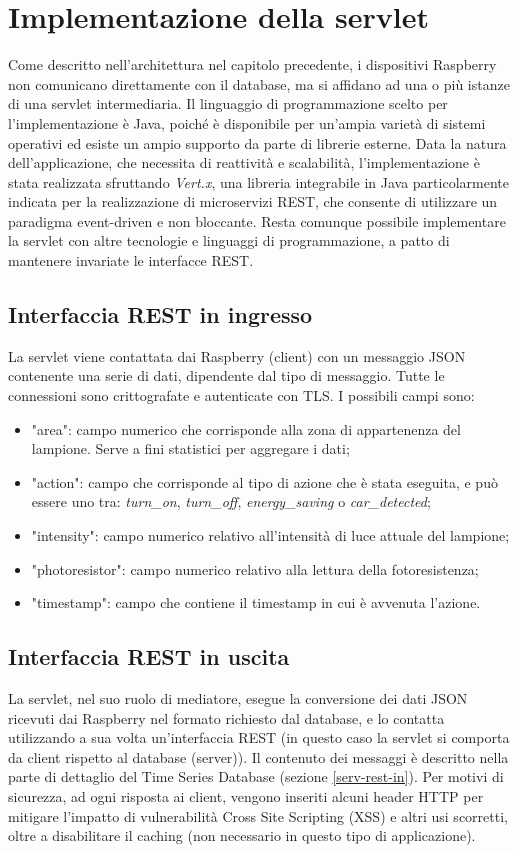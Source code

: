 \section{Implementazione della servlet \label{serv-impl}}
Come descritto nell'architettura nel capitolo precedente, i dispositivi Raspberry non comunicano direttamente con il database, ma si affidano ad una o più istanze di una servlet intermediaria.
Il linguaggio di programmazione scelto per l'implementazione è Java, poiché è disponibile per un'ampia varietà di sistemi operativi ed esiste un ampio supporto da parte di librerie esterne.
Data la natura dell'applicazione, che necessita di reattività e scalabilità, l'implementazione è stata realizzata sfruttando \textit{Vert.x}, una libreria integrabile in Java particolarmente indicata per la realizzazione di microservizi REST, che consente di utilizzare un paradigma event-driven e non bloccante.
Resta comunque possibile implementare la servlet con altre tecnologie e linguaggi di programmazione, a patto di mantenere invariate le interfacce REST.

\subsection{Interfaccia REST in ingresso \label{serv-rest-in}}
La servlet viene contattata dai Raspberry (client) con un messaggio JSON contenente una serie di dati, dipendente dal tipo di messaggio. Tutte le connessioni sono crittografate e autenticate con TLS.
I possibili campi sono:
\begin{itemize}
 \item "area": campo numerico che corrisponde alla zona di appartenenza del lampione. Serve a fini statistici per aggregare i dati;
 \item "action": campo che corrisponde al tipo di azione che è stata eseguita, e può essere uno tra: \textit{turn\_on}, \textit{turn\_off}, \textit{energy\_saving} o \textit{car\_detected};
 \item "intensity": campo numerico relativo all'intensità di luce attuale del lampione;
 \item "photoresistor": campo numerico relativo alla lettura della fotoresistenza;
 \item "timestamp": campo che contiene il timestamp in cui è avvenuta l'azione.
\end{itemize}

\subsection{Interfaccia REST in uscita}
La servlet, nel suo ruolo di mediatore, esegue la conversione dei dati JSON ricevuti dai Raspberry nel formato richiesto dal database, e lo contatta utilizzando a sua volta un'interfaccia REST (in questo caso la servlet si comporta da client rispetto al database (server)).
Il contenuto dei messaggi è descritto nella parte di dettaglio del Time Series Database (sezione \ref{serv-rest-in}).
Per motivi di sicurezza, ad ogni risposta ai client, vengono inseriti alcuni header HTTP per mitigare l'impatto di vulnerabilità Cross Site Scripting (XSS) e altri usi scorretti, oltre a disabilitare il caching (non necessario in questo tipo di applicazione).


